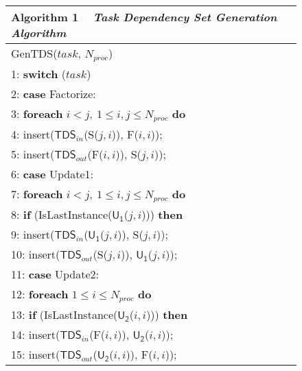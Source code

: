 \documentclass[12pt]{elsarticle}
\begin{document}
\begin{figure}\centering
\begin{tabular}{@{}p{\columnwidth}@{}}
\toprule
\textbf{Algorithm 1} ~ \textit{Task Dependency Set Generation Algorithm}
\\\midrule
\textsf{GenTDS}\textsf{(}$task$, $N_{proc}$\textsf{)}\\
\hspace{2.09mm}1: \textbf{switch} ($task$)\\
\hspace{2.09mm}2: \quad \textbf{case} \textsf{Factorize}:\\
\hspace{2.09mm}3: \quad\quad \textbf{foreach} $i < j,~1 \leq i,j \leq N_{proc}$ \textbf{do}\\\hspace{2.09mm}4: \quad\quad\quad \textsf{insert($\mathsf{TDS}_{in}$(S($j,i$)), F($i,i$));}\\\hspace{2.09mm}5: \quad\quad\quad \textsf{insert($\mathsf{TDS}_{out}$(F($i,i$)), S($j,i$));}\\
\hspace{2.09mm}6: \quad \textbf{case} \textsf{Update1}:\\
\hspace{2.09mm}7: \quad\quad \textbf{foreach} $i < j,~1 \leq i,j \leq N_{proc}$ \textbf{do}\\
\hspace{2.09mm}8: \quad\quad\quad \textbf{if} (\textsf{IsLastInstance($\mathsf{U_1}$($j,i$))}) \textbf{then}\\
\hspace{2.09mm}9: \quad\quad\quad\quad \textsf{insert($\mathsf{TDS}_{in}$($\mathsf{U_1}$($j,i$)), S($j,i$));}\\10: \quad\quad\quad\quad \textsf{insert($\mathsf{TDS}_{out}$(S($j,i$)), $\mathsf{U_1}$($j,i$));}\\
11: \quad \textbf{case} \textsf{Update2}:\\
12: \quad\quad \textbf{foreach} $1 \leq i \leq N_{proc}$ \textbf{do}\\
13: \quad\quad\quad \textbf{if} (\textsf{IsLastInstance($\mathsf{U_2}$($i,i$))}) \textbf{then}\\
14: \quad\quad\quad\quad \textsf{insert($\mathsf{TDS}_{in}$(F($i,i$)), $\mathsf{U_2}$($i,i$));}\\15: \quad\quad\quad\quad \textsf{insert($\mathsf{TDS}_{out}$($\mathsf{U_2}$($i,i$)), F($i,i$));}\\

\end{tabular}
\end{figure}
\end{document}
